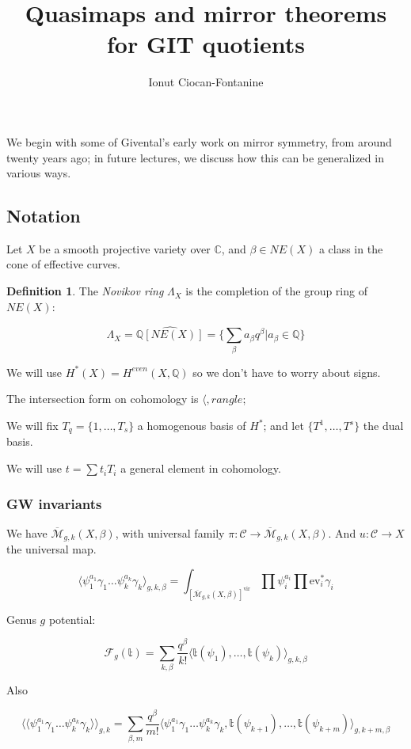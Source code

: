 \documentclass{amsart}
\title{Quasimaps and mirror theorems for GIT quotients}
\author{Ionut Ciocan-Fontanine}
\theoremstyle{definition}
\newtheorem{definition}[dummy]{Definition}
\newcommand{\Mbar}{\overline{\mathcal{M}}}
\newcommand{\Q}{\mathbb{Q}}
\newcommand{\C}{\mathbb{C}}
\newcommand{\one}{1}
\newcommand{\ttt}{\mathbb{t}}
\newcommand{\ev}{\text{ev}}
\newcommand{\vir}{\text{vir}}
\begin{document}
\maketitle

We begin with some of Givental's early work on mirror symmetry, from around twenty years ago; in future lectures, we discuss how this can be generalized in various ways.

\subsection{Notation}

Let $X$ be a smooth projective variety over $\C$, and $\beta\in NE(X)$ a class in the cone of effective curves.

\begin{definition}
The \emph{Novikov ring} $\Lambda_X$ is the completion of the group ring of $NE(X)$:

$$\Lambda_X=\hat{\Q[NE(X)]}=\{\sum_\beta a_\beta q^\beta|a_\beta\in\Q\}$$
\end{definition}

We will use $H^*(X)=H^{even}(X,\Q)$ so we don't have to worry about signs.

The intersection form on cohomology is $\langle, rangle$; 


We will fix $T_q=\{\one,\dots, T_s\}$ a homogenous basis of $H^*$; and let $\{T^1,\dots, T^s\}$ the dual basis.

We will use $t=\sum t_i T_i$ a general element in cohomology.

\subsubsection{GW invariants}

We have $\Mbar_{g,k}(X,\beta)$, with universal family $\pi:\mathcal{C}\to\Mbar_{g,k}(X,\beta)$.  And $u:\mathcal{C}\to X$ the universal map.

$$\langle \psi_1^{a_1}\gamma_1\dots \psi_k^{a_k}\gamma_k\rangle_{g,k,\beta}
=\int_{[\Mbar_{g,k}(X,\beta)]^{\vir}} \prod \psi_i^{a_i} \prod \ev_i^* \gamma_i$$



Genus $g$ potential:

$$\mathcal{F}_g(\ttt)=\sum_{k,\beta} \frac{q^\beta}{k!} \langle \ttt(\psi_1),\dots,\ttt(\psi_k)\rangle_{g,k,\beta}$$

Also

$$\langle\langle \psi_1^{a_1}\gamma_1\dots \psi_k^{a_k}\gamma_k\rangle\rangle_{g,k}=\sum_{\beta,m}\frac{q^\beta}{m!}\langle \psi_1^{a_1}\gamma_1\dots \psi_k^{a_k}\gamma_k, \ttt(\psi_{k+1}),\dots,\ttt(\psi_{k+m})\rangle_{g,k+m,\beta}$$
\end{document}
